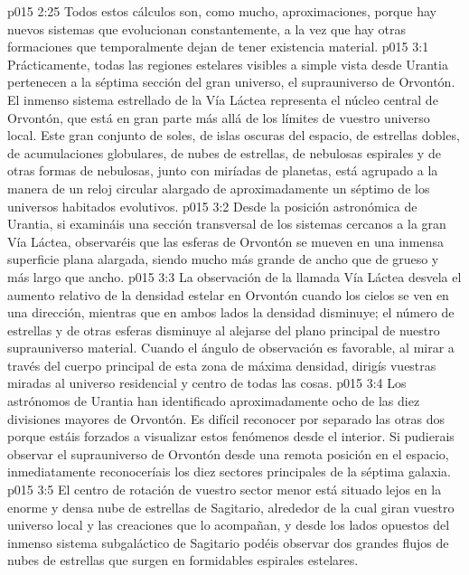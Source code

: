 \vs p015 2:25 \pc Todos estos cálculos son, como mucho, aproximaciones, porque hay nuevos sistemas que evolucionan constantemente, a la vez que hay otras formaciones que temporalmente dejan de tener existencia material.
\vs p015 3:1 Prácticamente, todas las regiones estelares visibles a simple vista desde Urantia pertenecen a la séptima sección del gran universo, el suprauniverso de Orvontón. El inmenso sistema estrellado de la Vía Láctea representa el núcleo central de Orvontón, que está en gran parte más allá de los límites de vuestro universo local. Este gran conjunto de soles, de islas oscuras del espacio, de estrellas dobles, de acumulaciones globulares, de nubes de estrellas, de nebulosas espirales y de otras formas de nebulosas, junto con miríadas de planetas, está agrupado a la manera de un reloj circular alargado de aproximadamente un séptimo de los universos habitados evolutivos.
\vs p015 3:2 Desde la posición astronómica de Urantia, si examináis una sección transversal de los sistemas cercanos a la gran Vía Láctea, observaréis que las esferas de Orvontón se mueven en una inmensa superficie plana alargada, siendo mucho más grande de ancho que de grueso y más largo que ancho.
\vs p015 3:3 La observación de la llamada Vía Láctea desvela el aumento relativo de la densidad estelar en Orvontón cuando los cielos se ven en una dirección, mientras que en ambos lados la densidad disminuye; el número de estrellas y de otras esferas disminuye al alejarse del plano principal de nuestro suprauniverso material. Cuando el ángulo de observación es favorable, al mirar a través del cuerpo principal de esta zona de máxima densidad, dirigís vuestras miradas al universo residencial y centro de todas las cosas.
\vs p015 3:4 \pc Los astrónomos de Urantia han identificado aproximadamente ocho de las diez divisiones mayores de Orvontón. Es difícil reconocer por separado las otras dos porque estáis forzados a visualizar estos fenómenos desde el interior. Si pudierais observar el suprauniverso de Orvontón desde una remota posición en el espacio, inmediatamente reconoceríais los diez sectores principales de la séptima galaxia.
\vs p015 3:5 El centro de rotación de vuestro sector menor está situado lejos en la enorme y densa nube de estrellas de Sagitario, alrededor de la cual giran vuestro universo local y las creaciones que lo acompañan, y desde los lados opuestos del inmenso sistema subgaláctico de Sagitario podéis observar dos grandes flujos de nubes de estrellas que surgen en formidables espirales estelares.
